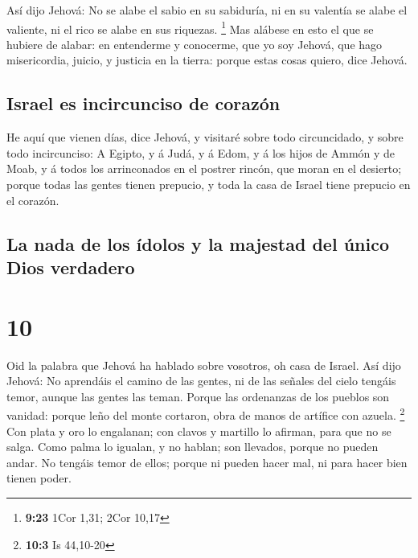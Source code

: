  Así dijo Jehová: No se alabe el sabio en su sabiduría,
ni en su valentía se alabe el valiente, ni el rico se alabe en sus
riquezas. \footnote{\textbf{9:23} 1Cor 1,31; 2Cor 10,17} 
Mas alábese en esto el que se hubiere de alabar: en entenderme y
conocerme, que yo soy Jehová, que hago misericordia, juicio, y justicia
en la tierra: porque estas cosas quiero, dice Jehová.

\hypertarget{israel-es-incircunciso-de-corazuxf3n}{%
\subsection{Israel es incircunciso de
corazón}\label{israel-es-incircunciso-de-corazuxf3n}}

 He aquí que vienen días, dice Jehová, y visitaré sobre
todo circuncidado, y sobre todo incircunciso:  A Egipto,
y á Judá, y á Edom, y á los hijos de Ammón y de Moab, y á todos los
arrinconados en el postrer rincón, que moran en el desierto; porque
todas las gentes tienen prepucio, y toda la casa de Israel tiene
prepucio en el corazón.

\hypertarget{la-nada-de-los-uxeddolos-y-la-majestad-del-uxfanico-dios-verdadero}{%
\subsection{La nada de los ídolos y la majestad del único Dios
verdadero}\label{la-nada-de-los-uxeddolos-y-la-majestad-del-uxfanico-dios-verdadero}}

\hypertarget{section-9}{%
\section{10}\label{section-9}}

 Oid la palabra que Jehová ha hablado sobre vosotros, oh
casa de Israel.  Así dijo Jehová: No aprendáis el camino
de las gentes, ni de las señales del cielo tengáis temor, aunque las
gentes las teman.  Porque las ordenanzas de los pueblos
son vanidad: porque leño del monte cortaron, obra de manos de artífice
con azuela. \footnote{\textbf{10:3} Is 44,10-20}  Con
plata y oro lo engalanan; con clavos y martillo lo afirman, para que no
se salga.  Como palma lo igualan, y no hablan; son
llevados, porque no pueden andar. No tengáis temor de ellos; porque ni
pueden hacer mal, ni para hacer bien tienen poder.

